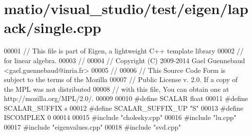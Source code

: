 \hypertarget{matio_2visual__studio_2test_2eigen_2lapack_2single_8cpp_source}{}\section{matio/visual\+\_\+studio/test/eigen/lapack/single.cpp}
\label{matio_2visual__studio_2test_2eigen_2lapack_2single_8cpp_source}

\begin{DoxyCode}
00001 \textcolor{comment}{// This file is part of Eigen, a lightweight C++ template library}
00002 \textcolor{comment}{// for linear algebra.}
00003 \textcolor{comment}{//}
00004 \textcolor{comment}{// Copyright (C) 2009-2014 Gael Guennebaud <gael.guennebaud@inria.fr>}
00005 \textcolor{comment}{//}
00006 \textcolor{comment}{// This Source Code Form is subject to the terms of the Mozilla}
00007 \textcolor{comment}{// Public License v. 2.0. If a copy of the MPL was not distributed}
00008 \textcolor{comment}{// with this file, You can obtain one at http://mozilla.org/MPL/2.0/.}
00009 
00010 \textcolor{preprocessor}{#define SCALAR        float}
00011 \textcolor{preprocessor}{#define SCALAR\_SUFFIX s}
00012 \textcolor{preprocessor}{#define SCALAR\_SUFFIX\_UP "S"}
00013 \textcolor{preprocessor}{#define ISCOMPLEX     0}
00014 
00015 \textcolor{preprocessor}{#include "cholesky.cpp"}
00016 \textcolor{preprocessor}{#include "lu.cpp"}
00017 \textcolor{preprocessor}{#include "eigenvalues.cpp"}
00018 \textcolor{preprocessor}{#include "svd.cpp"}
\end{DoxyCode}
